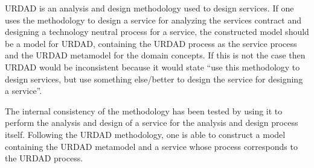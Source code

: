 URDAD is an analysis and design methodology used to design services. If one uses the methodology to design a service for analyzing the services contract and designing a technology neutral process for a service, the constructed model should be a model for URDAD, containing the URDAD process as the service process and the URDAD metamodel for the domain concepts. If this is not the case then URDAD would be inconsistent because it would state ``use this methodology to design services, but use something else/better to design the service for designing a service''. 

The internal consistency of the methodology has been tested by using it to perform the analysis and design of a service for the analysis and design process itself. Following the URDAD methodology, one is able to construct a model containing the URDAD metamodel and a service whose process corresponds to the URDAD process.